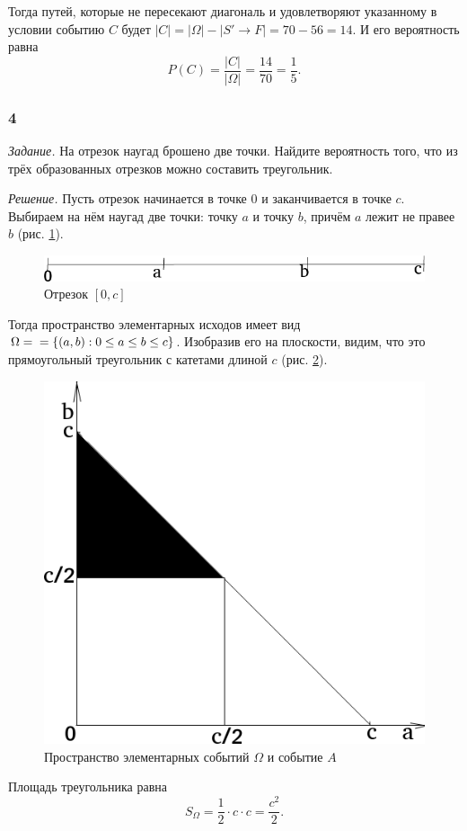Тогда путей,
которые не пересекают диагональ и удовлетворяют указанному в условии событию $C$ будет
$ \left| C \right| =
\left| \Omega \right| - \left| S' \rightarrow F \right| =
70 - 56 =
14$.
И его вероятность равна
$$P \left( C \right) =
\frac{ \left| C \right| }{ \left| \Omega \right| } =
\frac{14}{70} =
\frac{1}{5}.$$

\subsubsection*{4}

\textit{Задание.} На отрезок наугад брошено две точки.
Найдите вероятность того, что из трёх образованных отрезков можно составить треугольник.

\textit{Решение.} Пусть отрезок начинается в точке 0 и заканчивается в точке $c$.
Выбираем на нём наугад две точки: точку $a$ и точку $b$, причём $a$ лежит не правее $b$ (рис. \ref{fig:24}).

\begin{figure}[h!]
  \centering
  \includegraphics[width=.4\textwidth]{./pictures/t1v2_4.png}
  \caption{Отрезок $ \left[ 0, c \right] $}
  \label{fig:24}
\end{figure}

Тогда пространство элементарных исходов имеет вид $ \Omega =  \\
= \left\{ \left( a, b \right): 0 \leq a \leq b \leq c \right\} $.
Изобразив его на плоскости, видим, что это прямоугольный треугольник с катетами длиной $c$ (рис. \ref{fig:241}).

\begin{figure}[h!]
  \centering
  \includegraphics[width=.4\textwidth]{./pictures/t1v2_41.png}
  \caption{Пространство элементарных событий $ \Omega$ и событие $A$}
  \label{fig:241}
\end{figure}

Площадь треугольника равна
$$S_{ \Omega } =
\frac{1}{2} \cdot c \cdot c =
\frac{c^2}{2}.$$

